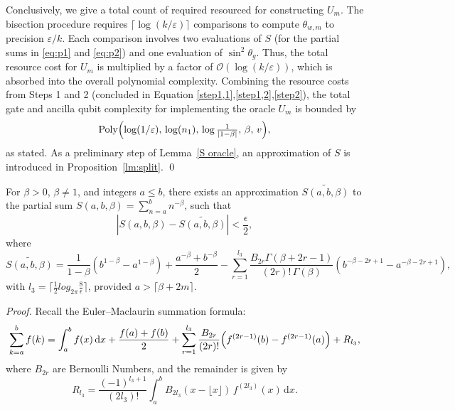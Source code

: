 \documentclass[aps,pra,twocolumn,superscriptaddress,preprintnumbers,amsmath,amssymb]{revtex4-2}
\begin{document}
Conclusively, we give a total count of required resourced for constructing $U_m$. The bisection procedure requires \( \lceil \log(k/\varepsilon) \rceil \) comparisons to compute \( \theta_{w,m} \) to precision \( \varepsilon/k \). Each comparison involves two evaluations of \( S \) (for the partial sums in \eqref{eq:p1} and \eqref{eq:p2}) and one evaluation of \( \sin^2 \theta_g \). Thus, the total resource cost for \( U_m \) is multiplied by a factor of \( \mathcal{O}(\log(k/\varepsilon)) \), which is absorbed into the overall polynomial complexity. Combining the resource costs from Steps 1 and 2 (concluded in Equation \eqref{step1,1},\eqref{step1,2},\eqref{step2}), the total gate and ancilla qubit complexity for implementing the oracle \( U_m \) is bounded by
\begin{equation}
    \mathrm{Poly}\Bigl(\log(1/\varepsilon),\,\log(n_1),\,\log\tfrac{1}{|1-\beta|},\,\beta,\,v\Bigr),
    \end{equation}
 as stated. As a preliminary step of Lemma~\ref{S oracle}, an approximation of \( S \) is introduced in Proposition~\ref{lm:split}. \qed
\begin{proposition}
    \label{lm:split}
For $\beta>0$, $\beta\neq1$, and integers $a\leq b$, there exists an approximation $\widetilde{S(a, b, \beta)}$ to the partial sum
$S(a, b, \beta) = \textstyle\sum_{n=a}^{b} n^{-\beta}$, such that
\begin{equation}
\left| S(a, b, \beta) - \widetilde{S(a, b, \beta)} \right| < \frac{\epsilon}{2},
\end{equation}
where
\begin{equation}\label{eq:widetildeS}
    \widetilde{S(a,b,\beta)}=\frac{1}{1-\beta}(b^{1-\beta}-a^{1-\beta})+ \frac{a^{-\beta}+b^{-\beta}}{2}-\sum_{r=1}^{l_3}\frac{B_{2r}\Gamma(\beta+2r-1)}{(2r)!\,\Gamma(\beta)}( b^{-\beta-2r+1}-a^{-\beta-2r+1}),
\end{equation}
with $l_3=\lceil\frac{1}{2}log_{2\pi}\frac{8}{\epsilon}\rceil$, provided $a>\lceil \beta+2m\rceil$.
\end{proposition}
\noindent\textit{Proof.} Recall the Euler–Maclaurin summation formula:
\begin{equation}
\sum_{k=a}^{b} f(k)
  = \int_{a}^{b} f(x)\,\mathrm{d}x
  + \frac{f(a)+f(b)}{2}
  + \sum_{r=1}^{l_3} \frac{B_{2r}}{(2r)!}\Bigl(f^{(2r-1)}(b)-f^{(2r-1)}(a)\Bigr)
  + R_{l_3},
\end{equation}
where $B_{2r}$ are Bernoulli Numbers, and the remainder is given by
\begin{equation}
R_{l_3}= \frac{(-1)^{l_3+1}}{(2l_3)!}\int_{a}^{b} B_{2l_3}(x-\lfloor x\rfloor)\,
        f^{(2l_3)}(x)\,\mathrm{d}x.
\end{equation}
\end{document}

